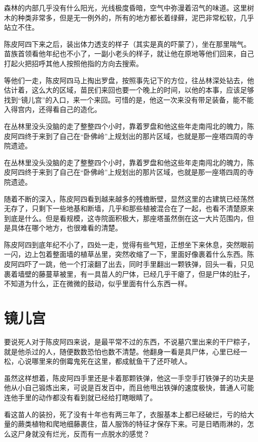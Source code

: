 森林的内部几乎没有什么阳光，光线极度昏暗，空气中弥漫着沼气的味道。这里树木的种类非常多，但是无一例外的，所有的地方都长着绿藓，泥巴非常松软，几乎站立不住。

陈皮阿四下来之后，装出体力透支的样子（其实是真的吓蒙了），坐在那里喘气。苗族首领看他年纪也不小了，一副小老头的样子，就让他在原地等他们回来，自己打起火把招呼其他人按照他指的方向去搜索。

等他们一走，陈皮阿四马上掏出罗盘，按照事先记下的方位，往丛林深处钻去，他估计着，这么大的区域，苗民们来回也要一个晚上的时间，以他的本事，应该足够找到“镜儿宫”的入口，来一个来回。可惜的是，他这一次来没有带足装备，能不能入得宫内，还得看自己的造化。

在丛林里没头没脑的走了整整四个小时，靠着罗盘和他这些年走南闯北的魄力，陈皮阿四终于来到了自己在“卧佛岭”上规划出的那片区域，也就是那一座塔四周的寺院遗迹。

在丛林里没头没脑的走了整整四个小时，靠着罗盘和他这些年走南闯北的魄力，陈皮阿四终于来到了自己在“卧佛岭”上规划出的那片区域，也就是那一座塔四周的寺院遗迹。

随着不断的深入，陈皮阿四看到越来越多的残檐断壁，显然这里的古建筑已经荡然无存了，只剩下一些地基和断墙，几乎和那些植被混合在了一起，也看不清楚原来到底是什么。但是看规模，这寺院面积极大，那座塔虽然倒在这一大片范围内，但是具体在哪个地方，也很难看的清楚。

陈皮阿四到底年纪不小了，四处一走，觉得有些气短，正想坐下来休息，突然眼前一闪，边上包着整面墙的植草丛里，突然收缩了一下，里面好像裹着什么东西。陈皮阿四吓了一跳，他一个打滚翻了出去，同时手里翻出一颗铁弹，回头一看，只见裹着墙壁的藤蔓草被里，有一具苗人的尸体，已经几乎干瘪了，但是尸体的肚子，不知道为什么，正在微微的鼓动，似乎里面有什么东西一样。

\chapter{镜儿宫}

要说死人对于陈皮阿四来说，是最平常不过的东西，不说墓穴里出来的干尸粽子，就是他杀过的人，随便数数恐怕也数不清楚。他翻身一看是具尸体，心里已经一松，心说哪里来的倒霉鬼死在这里，都成鱿鱼干了还吓唬人。

虽然这样想着，陈皮阿四手里还是卡着那颗铁弹，他这一手空手打铁弹子的功夫是他从小自己锻炼出来，可说是百发百中，而且他甩出铁弹的速度极快，普通人可能连他手里的动作都没有看到就已经给打瞎眼睛了。

看这苗人的装扮，死了没有十年也有两三年了，衣服基本上都已经破烂，亏的给大量的蕨类植物和爬地细藤裹住，苗人服饰的特征才保存下来。可是日晒雨淋的，怎么这尸身就没有烂光，反而有一点脱水的感觉？

